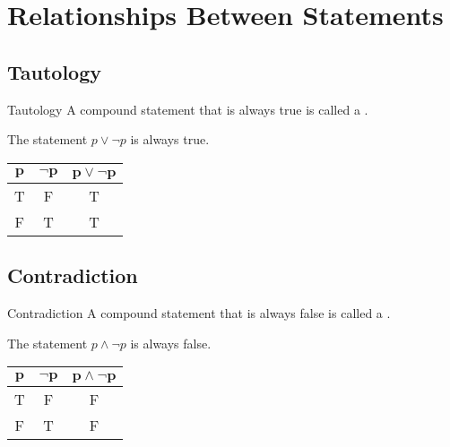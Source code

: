 \documentclass[../notes.tex]{subfiles}
\begin{document}
		\section{Relationships Between Statements}
			\subsection{Tautology}
				\begin{definition}[width=0.7\textwidth]{Tautology}
					A compound statement that is always true is called a .
				\end{definition}
				\begin{example}[width=0.55\textwidth]
					The statement $p \lor \lnot p$ is always true.
					\begin{center}
						\begin{tabular}{| c c | c |}
							\hline
							$\mathbf{p}$ & $\mathbf{\lnot p}$ & $\mathbf{p \lor \lnot p}$\\
							\hline
							T & F & T\\
							F & T & T\\
							\hline
						\end{tabular}
					\end{center}
				\end{example}
			\subsection{Contradiction}
				\begin{definition}[width=0.75\textwidth]{Contradiction}
					A compound statement that is always false is called a .
				\end{definition}
				\begin{example}[width=0.55\textwidth]
					The statement $p \land \lnot p$ is always false.
					\begin{center}
						\begin{tabular}{| c c | c |}
							\hline
							$\mathbf{p}$ & $\mathbf{\lnot p}$ & $\mathbf{p \land \lnot p}$\\
							\hline
							T & F & F\\
							F & T & F\\
							\hline
						\end{tabular}
					\end{center}
				\end{example}
\end{document}
